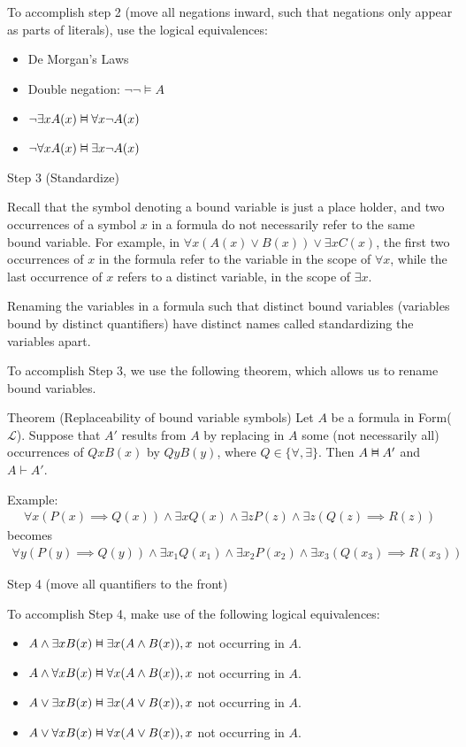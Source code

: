 \documentclass{article}
\newcommand{\vDashv}{%
  \mathrel{%
    \text{%
      \ooalign{$\vDash$\cr\reflectbox{$\vDash$}\cr}%
    }%
  }%
}
\begin{document}
To accomplish step 2 (move all negations inward, such that negations only appear as parts of literals), use the logical equivalences:
\begin{itemize}
    \item De Morgan's Laws
    \item Double negation: $\neg \neg \vDash A$
    \item $\neg \exists x A(x) \vDashv \forall x \neg A(x)$
    \item $\neg \forall x A(x) \vDashv \exists x \neg A(x)$
\end{itemize}

Step 3 (Standardize)

Recall that the symbol denoting a bound variable is just a place holder, and two occurrences of a symbol $x$ in a formula do not necessarily refer to the same bound variable. For example, in $\forall x (A(x) \vee B(x)) \vee \exists x C(x)$, the first two occurrences of $x$ in the formula refer to the variable in the scope of $\forall x$, while the last occurrence of $x$ refers to a distinct variable, in the scope of $\exists x$.

Renaming the variables in a formula such that distinct bound variables (variables bound by distinct quantifiers) have distinct names called standardizing the variables apart.

To accomplish Step 3, we use the following theorem, which allows us to rename bound variables.

Theorem (Replaceability of bound variable symbols) Let $A$ be a formula in Form($\mathcal{L}$). Suppose that $A'$ results from $A$ by replacing in $A$ some (not necessarily all) occurrences of $QxB(x)$ by $QyB(y)$, where $Q \in \{\forall, \exists\}$. Then $A \vDashv A'$ and $A \vdash A'$.

Example:
\begin{align*}
\forall x (P(x) \implies Q(x)) \wedge \exists x Q(x) \wedge \exists z P(z) \wedge \exists z (Q(z) \implies R(z))
\end{align*}
becomes
\begin{align*}
\forall y (P(y) \implies Q(y)) \wedge \exists x_1 Q(x_1) \wedge \exists x_2 P(x_2) \wedge \exists x_3 (Q(x_3) \implies R(x_3))
\end{align*}

Step 4 (move all quantifiers to the front)

To accomplish Step 4, make use of the following logical equivalences:
\begin{itemize}
    \item $A \wedge \exists x B(x) \vDashv \exists x (A \wedge B(x)), x$ not occurring in $A$.
    \item $A \wedge \forall x B(x) \vDashv \forall x (A \wedge B(x)), x$ not occurring in $A$.
    \item $A \vee \exists x B(x) \vDashv \exists x (A \vee B(x)), x$ not occurring in $A$.
    \item $A \vee \forall x B(x) \vDashv \forall x (A \vee B(x)), x$ not occurring in $A$.
\end{itemize}
\end{document}
